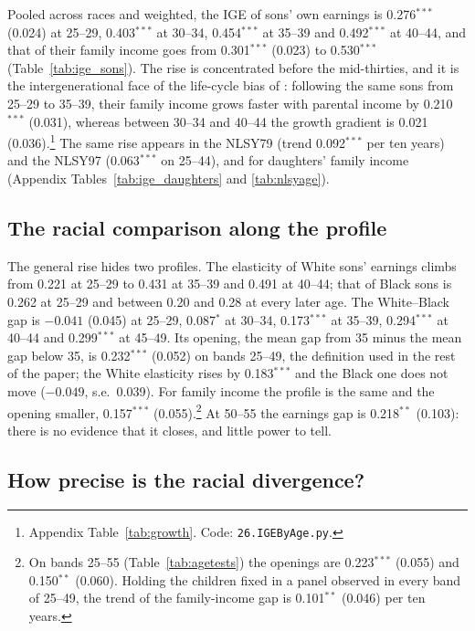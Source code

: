 Pooled across races and weighted, the IGE of sons' own earnings is 0.276$^{***}$ (0.024) at 25--29, 0.403$^{***}$ at
30--34, 0.454$^{***}$ at 35--39 and 0.492$^{***}$ at 40--44, and that of their family income goes from 0.301$^{***}$
(0.023) to 0.530$^{***}$ (Table~\ref{tab:ige_sons}). The rise is concentrated before the mid-thirties, and it is the
intergenerational face of the life-cycle bias of \citet{haider2006life}: following the same sons from 25--29 to 35--39,
their family income grows faster with parental income by 0.210$^{***}$ (0.031), whereas between 30--34 and 40--44 the
growth gradient is 0.021 (0.036).\footnote{Appendix Table~\ref{tab:growth}. Code: \texttt{26.IGEByAge.py}.} The same
rise appears in the NLSY79 (trend 0.092$^{***}$ per ten years) and the NLSY97 (0.063$^{***}$ on 25--44), and for
daughters' family income (Appendix Tables~\ref{tab:ige_daughters} and \ref{tab:nlsyage}).



\subsection{The racial comparison along the profile}

The general rise hides two profiles. The elasticity of White sons' earnings climbs from 0.221 at 25--29 to 0.431 at
35--39 and 0.491 at 40--44; that of Black sons is 0.262 at 25--29 and between 0.20 and 0.28 at every later age. The
White--Black gap is $-0.041$ (0.045) at 25--29, 0.087$^{*}$ at 30--34, 0.173$^{***}$ at 35--39, 0.294$^{***}$ at
40--44 and 0.299$^{***}$ at 45--49. Its opening, the mean gap from 35 minus the mean gap below 35, is 0.232$^{***}$
(0.052) on bands 25--49, the definition used in the rest of the paper; the White elasticity rises by 0.183$^{***}$ and
the Black one does not move ($-0.049$, s.e.\ 0.039). For family income the profile is the same and the opening smaller,
0.157$^{***}$ (0.055).\footnote{On bands 25--55 (Table~\ref{tab:agetests}) the openings are 0.223$^{***}$ (0.055) and
0.150$^{**}$ (0.060). Holding the children fixed in a panel observed in every band of 25--49, the trend of the
family-income gap is 0.101$^{**}$ (0.046) per ten years.} At 50--55 the earnings gap is 0.218$^{**}$ (0.103): there is no
evidence that it closes, and little power to tell.



\subsection{How precise is the racial divergence?}

